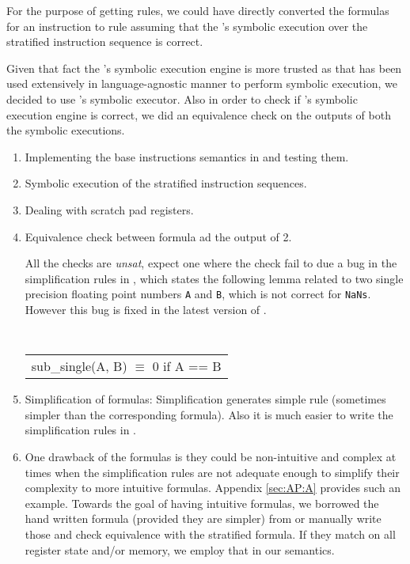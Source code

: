 For the purpose of getting  \K rules, we could have directly converted the
\Strata formulas for an instruction to \K rule assuming that the \Strata's
symbolic execution over the stratified instruction sequence is correct.

Given that fact the \K's symbolic execution engine is more trusted as that has
been used extensively in language-agnostic manner to perform symbolic execution,
     we decided to use \K's symbolic executor. Also in order to check if
     \Strata's symbolic execution engine is correct, we did an equivalence check
     on the outputs of both the symbolic executions.   
 

\begin{enumerate}
\item Implementing the base instructions semantics in \K and testing them.
\item Symbolic execution of the stratified instruction sequences.
\item Dealing with scratch pad registers.
\item Equivalence check between \Strata formula ad the output of 2.
   
   All the checks are \emph{unsat}, expect one where the check fail to due a bug
   in the simplification rules in \Strata, which states the following lemma
   related to two single precision floating point numbers  {\tt A}  and {\tt B},
   which is not correct for {\tt NaNs}. However this bug is fixed in the latest
   version of \Stoke. 
   
   
   { \tt  
        \begin{tabular}[b]{l}
   \qquad sub\_single(A, B) $\equiv$ 0 if A == B     
      \end{tabular}
  }
   
\item {Simplification of formulas:} Simplification generates simple \K rule
(sometimes simpler than the corresponding \Strata formula).  Also it is much
easier to write the simplification rules in \K.


\item One drawback of the \Strata formulas is they could be non-intuitive and
complex at times when the simplification rules are not adequate enough to
simplify their complexity to more intuitive formulas. Appendix \ref{sec:AP:A}
provides such an example.  Towards the goal of having intuitive formulas, we
borrowed the hand written formula (provided they are simpler) from \Stoke or
manually write those  and check equivalence with the stratified formula. If they
match on all register state and/or memory, we employ that in our \K semantics.


       


\end{enumerate}

